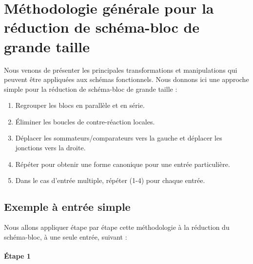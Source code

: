 \section[Réduction de schéma-bloc de grande taille]
{Méthodologie générale pour la réduction de schéma-bloc de grande taille}

Nous venons de présenter les principales transformations et manipulations qui 
peuvent être appliquées aux schémas fonctionnels. Nous donnons ici une 
approche simple pour la réduction de schéma-bloc de grande 
taille \cite{Ostertag}:
\begin{enumerate}
    \item Regrouper les blocs en parallèle et en série.
    \item \'Eliminer les boucles de contre-réaction locales.
    \item Déplacer les sommateurs/comparateurs vers la gauche et déplacer les 
          jonctions vers la droite.
    \item Répéter pour obtenir une forme canonique pour une entrée particulière.
    \item Dans le cas d'entrée multiple, répéter (1-4) pour chaque entrée. 
\end{enumerate}

\subsection{Exemple à entrée simple}
Nous allons appliquer étape par étape cette méthodologie à la réduction du 
schéma-bloc, à une seule entrée, suivant :

\begin{center}
    
\end{center}

\paragraph{\'Etape 1}

